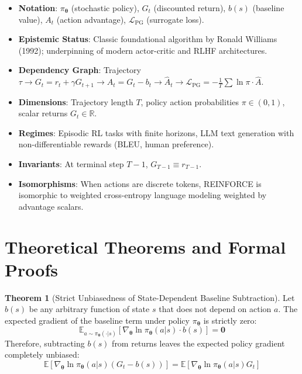 \documentclass[11pt,a4paper]{article}
\theoremstyle{definition}
\newtheorem{theorem}{\textbf{Theorem}}[section]
\begin{document}
\begin{itemize}
    \item \textbf{Notation}: $\pi_{\boldsymbol{\theta}}$ (stochastic policy), $G_t$ (discounted return), $b(s)$ (baseline value), $A_t$ (action advantage), $\mathcal{L}_{\text{PG}}$ (surrogate loss).
    \item \textbf{Epistemic Status}: Classic foundational algorithm by Ronald Williams (1992); underpinning of modern actor-critic and RLHF architectures.
    \item \textbf{Dependency Graph}: Trajectory $\tau \to G_t = r_t + \gamma G_{t+1} \to A_t = G_t - b_t \to \widehat{A}_t \to \mathcal{L}_{\text{PG}} = - \frac{1}{T}\sum \ln \pi \cdot \widehat{A}$.
    \item \textbf{Dimensions}: Trajectory length $T$, policy action probabilities $\pi \in (0, 1)$, scalar returns $G_t \in \mathbb{R}$.
    \item \textbf{Regimes}: Episodic RL tasks with finite horizons, LLM text generation with non-differentiable rewards (BLEU, human preference).
    \item \textbf{Invariants}: At terminal step $T-1$, $G_{T-1} \equiv r_{T-1}$.
    \item \textbf{Isomorphisms}: When actions are discrete tokens, REINFORCE is isomorphic to weighted cross-entropy language modeling weighted by advantage scalars.
\end{itemize}

\section{Theoretical Theorems and Formal Proofs}

\begin{theorem}[Strict Unbiasedness of State-Dependent Baseline Subtraction]
Let $b(s)$ be any arbitrary function of state $s$ that does not depend on action $a$. The expected gradient of the baseline term under policy $\pi_{\boldsymbol{\theta}}$ is strictly zero:
{\boldmath
\begin{equation}
\mathbb{E}_{a \sim \pi_{\boldsymbol{\theta}}(\cdot | s)} \left[ \nabla_{\boldsymbol{\theta}} \ln \pi_{\boldsymbol{\theta}}(a | s) \cdot b(s) \right] = \mathbf{0}
\end{equation}
}
Therefore, subtracting $b(s)$ from returns leaves the expected policy gradient completely unbiased:
{\boldmath
\begin{equation}
\mathbb{E}\left[ \nabla_{\boldsymbol{\theta}} \ln \pi_{\boldsymbol{\theta}}(a | s) \left( G_t - b(s) \right) \right] = \mathbb{E}\left[ \nabla_{\boldsymbol{\theta}} \ln \pi_{\boldsymbol{\theta}}(a | s) G_t \right]
\end{equation}
}
\end{theorem}
\end{document}
